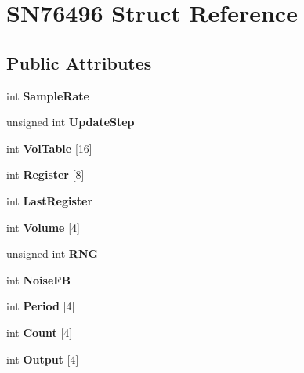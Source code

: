 \hypertarget{structSN76496}{\section{S\-N76496 Struct Reference}
\label{structSN76496}
}
\subsection*{Public Attributes}
\begin{DoxyCompactItemize}
\item 
\hypertarget{structSN76496_a73627ecbcdcfb2c85fb0522ef608923b}{int {\bfseries Sample\-Rate}}\label{structSN76496_a73627ecbcdcfb2c85fb0522ef608923b}

\item 
\hypertarget{structSN76496_ae7d15e228eae2bd1f38db690f7591498}{unsigned int {\bfseries Update\-Step}}\label{structSN76496_ae7d15e228eae2bd1f38db690f7591498}

\item 
\hypertarget{structSN76496_adbb024b32b013f3100fb81ec554985db}{int {\bfseries Vol\-Table} \mbox{[}16\mbox{]}}\label{structSN76496_adbb024b32b013f3100fb81ec554985db}

\item 
\hypertarget{structSN76496_a3e270755d4294259c471ba9186e7d880}{int {\bfseries Register} \mbox{[}8\mbox{]}}\label{structSN76496_a3e270755d4294259c471ba9186e7d880}

\item 
\hypertarget{structSN76496_a2b1d481e0ea53beb3dd2a3b045908e40}{int {\bfseries Last\-Register}}\label{structSN76496_a2b1d481e0ea53beb3dd2a3b045908e40}

\item 
\hypertarget{structSN76496_ac892182470a988f6fbb380b5b3c0d098}{int {\bfseries Volume} \mbox{[}4\mbox{]}}\label{structSN76496_ac892182470a988f6fbb380b5b3c0d098}

\item 
\hypertarget{structSN76496_abaa2332961dbb4b9b0561cf2bc966fb2}{unsigned int {\bfseries R\-N\-G}}\label{structSN76496_abaa2332961dbb4b9b0561cf2bc966fb2}

\item 
\hypertarget{structSN76496_a7acb47379747a2c48a0e5e3a8dd425dd}{int {\bfseries Noise\-F\-B}}\label{structSN76496_a7acb47379747a2c48a0e5e3a8dd425dd}

\item 
\hypertarget{structSN76496_ac490ccbb7211c54a75da7bfabf328916}{int {\bfseries Period} \mbox{[}4\mbox{]}}\label{structSN76496_ac490ccbb7211c54a75da7bfabf328916}

\item 
\hypertarget{structSN76496_ab5240e859d6582f960fb38fb8fe549d9}{int {\bfseries Count} \mbox{[}4\mbox{]}}\label{structSN76496_ab5240e859d6582f960fb38fb8fe549d9}

\item 
\hypertarget{structSN76496_ae04e820551d31bc2253c9424d9bca4e5}{int {\bfseries Output} \mbox{[}4\mbox{]}}\label{structSN76496_ae04e820551d31bc2253c9424d9bca4e5}

\end{DoxyCompactItemize}


